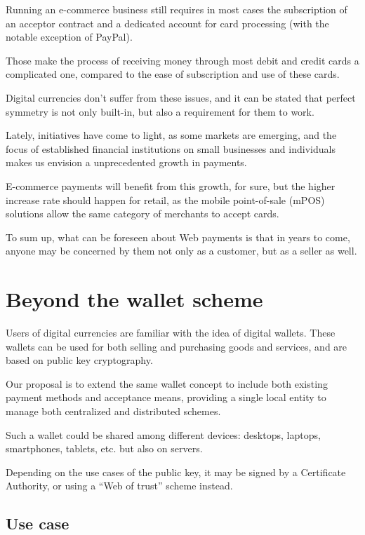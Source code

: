 Running an e-commerce business still requires in most cases the
subscription of an acceptor contract and a dedicated account for card
processing (with the notable exception of PayPal).

Those make the process of receiving money through most debit and credit
cards a complicated one, compared to the ease of subscription and use of
these cards.

Digital currencies don't suffer from these issues, and it can be stated
that perfect symmetry is not only built-in, but also a requirement for
them to work.

Lately, initiatives have come to light, as some markets are emerging,
and the focus of established financial institutions on small businesses
and individuals makes us envision a unprecedented growth in payments.

E-commerce payments will benefit from this growth, for sure, but the
higher increase rate should happen for retail, as the mobile
point-of-sale (mPOS) solutions allow the same category of merchants to
accept cards.

To sum up, what can be foreseen about Web payments is that in years to
come, anyone may be concerned by them not only as a customer, but as a
seller as well.

\section{Beyond the wallet scheme}\label{beyond-the-wallet-scheme}

Users of digital currencies are familiar with the idea of digital
wallets. These wallets can be used for both selling and purchasing goods
and services, and are based on public key cryptography.

Our proposal is to extend the same wallet concept to include both
existing payment methods and acceptance means, providing a single local
entity to manage both centralized and distributed schemes.

Such a wallet could be shared among different devices: desktops,
laptops, smartphones, tablets, etc. but also on servers.

Depending on the use cases of the public key, it may be signed by a
Certificate Authority, or using a ``Web of trust'' scheme instead.

\subsection{Use case}\label{use-case}


